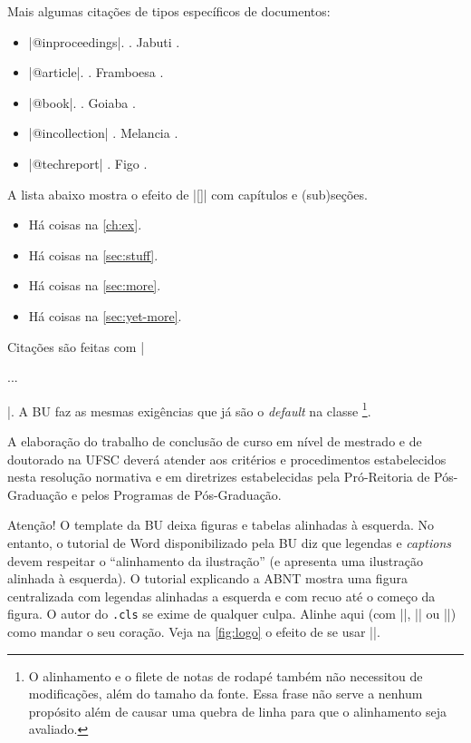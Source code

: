 \documentclass[embeddedlogo]{../ufsc-thesis-rn46-2019}
\begin{document}
Mais algumas citações de tipos específicos de documentos:
\begin{itemize}
\item \mt|@inproceedings|. . Jabuti
  \cite{Ullman1989magic}.
\item \mt|@article|. . Framboesa \cite{Distefano2019}.
\item \mt|@book|. . Goiaba \cite{Abiteboul1995}.
\item \mt|@incollection| . Melancia \cite{Forgy1989}.
\item \mt|@techreport| . Figo \cite{rdf11}.
\end{itemize}

A lista abaixo mostra o efeito de \mt|\autoref{}| com capítulos e (sub)seções.

\begin{itemize}
\item Há coisas na \autoref{ch:ex}.
\item Há coisas na \autoref{sec:stuff}.
\item Há coisas na \autoref{sec:more}.
\item Há coisas na \autoref{sec:yet-more}.
\end{itemize}

Citações são feitas com \mt|\begin{citacao}...\end{citacao}|. A BU faz
as mesmas exigências que já são o \textit{default} na classe
\footnote{O alinhamento e o filete de notas de rodapé também
  não necessitou de modificações, além do tamaho da fonte. Essa frase não serve a nenhum propósito além de causar uma quebra de linha para que o alinhamento seja avaliado.}.

\begin{citacao}
  A elaboração do trabalho de conclusão de curso em nível de mestrado
  e de doutorado na UFSC deverá atender aos critérios e procedimentos
  estabelecidos nesta resolução normativa e em diretrizes
  estabelecidas pela Pró-Reitoria de Pós-Graduação e pelos Programas
  de Pós-Graduação.
\end{citacao}

Atenção! O template da BU deixa figuras e tabelas alinhadas à esquerda. No
entanto, o tutorial de Word disponibilizado pela BU diz que legendas e
\emph{captions} devem respeitar o ``alinhamento da ilustração'' (e apresenta
uma ilustração alinhada à esquerda). O tutorial explicando a ABNT mostra uma
figura centralizada com legendas alinhadas a esquerda e com recuo até o começo
da figura. O autor do \texttt{.cls} se exime de qualquer culpa. Alinhe aqui
(com \mt|\centering|, \mt|\flushright| ou \mt|\flushleft|) como mandar o seu
coração. Veja na \autoref{fig:logo} o efeito de se usar \mt|\centering|.
\end{document}
